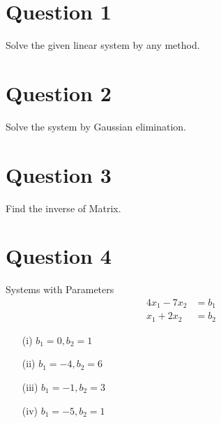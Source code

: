 \documentclass[12pt]{article}
\begin{document}
\section*{Question 1}
Solve the given linear system by any method.





\section*{Question 2}
Solve the system by Gaussian elimination.




\section*{Question 3}
Find the inverse of Matrix.








\section*{Question 4}
Systems with Parameters
\[
	\begin{aligned}
		4x_1 - 7x_2 & = b_1 \\
		x_1 + 2x_2  & = b_2
	\end{aligned}
\]

\begin{itemize}
	\item[(i)] $b_1 = 0, b_2 = 1$
	\item[(ii)] $b_1 = -4, b_2 = 6$
	\item[(iii)] $b_1 = -1, b_2 = 3$
	\item[(iv)] $b_1 = -5, b_2 = 1$
\end{itemize}





\end{document}
